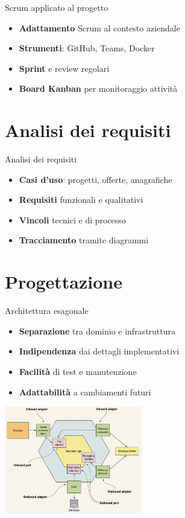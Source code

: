 \documentclass{beamer}
\begin{document}
\begin{frame}{Scrum applicato al progetto}
    \begin{itemize}
        \item \textbf{Adattamento} Scrum al contesto aziendale
        \item \textbf{Strumenti}: GitHub, Teams, Docker
        \item \textbf{Sprint} e review regolari
        \item \textbf{Board Kanban} per monitoraggio attività
    \end{itemize}
\end{frame}

\section{Analisi dei requisiti}
\begin{frame}{Analisi dei requisiti}
    \begin{itemize}
        \item \textbf{Casi d’uso}: progetti, offerte, anagrafiche
        \item \textbf{Requisiti} funzionali e qualitativi
        \item \textbf{Vincoli} tecnici e di processo
        \item \textbf{Tracciamento} tramite diagrammi
    \end{itemize}
\end{frame}

\section{Progettazione}
\begin{frame}{Architettura esagonale}
    \begin{itemize}
        \item \textbf{Separazione} tra dominio e infrastruttura
        \item \textbf{Indipendenza} dai dettagli implementativi
        \item \textbf{Facilità} di test e manutenzione
        \item \textbf{Adattabilità} a cambiamenti futuri
    \end{itemize}
    \includegraphics[width=0.45\textwidth]{images/classes/hexagonal-architecture-pattern.png} %
\end{frame}
\end{document}
